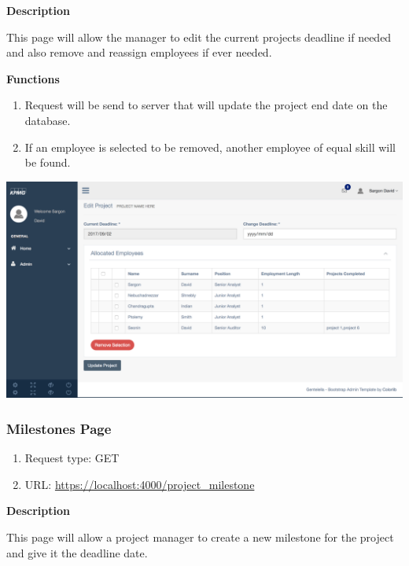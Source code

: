 \documentclass[a4paper,12pt]{article}
\begin{document}
				\textbf{Description}
				\begin{flushright}
				  This page will allow the manager to edit the current projects deadline if needed and also remove and reassign employees if ever needed.
				\end{flushright}
				
				\textbf{Functions}
				\begin{flushright}
				    \begin{enumerate}
				    	\item  Request will be send to server that will update the project end date on the database.
				    	\item If an employee is selected to be removed, another employee of equal skill will be found. 
				     \end{enumerate}
				\end{flushright}
				\includegraphics[width=0.99\linewidth]{Images/manager_project_edit.png}
				
		
	    \subsubsection{Milestones Page}
		 		\begin{enumerate}
				 	\item Request type: GET
				 	\item URL: \url{https://localhost:4000/project_milestone}
				 \end{enumerate}
				
				\textbf{Description}
				\begin{flushright}
				  This page will allow a project manager to create a new milestone for the project and give it the deadline date.
				\end{flushright}
				
\end{document}
